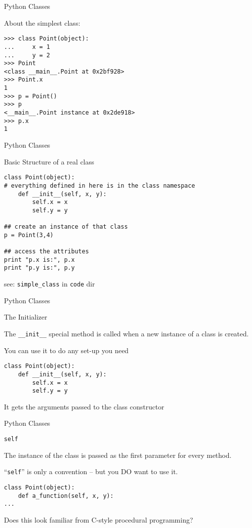 \documentclass{beamer}
\begin{document}
\begin{frame}[fragile]{Python Classes}

{\Large About the simplest class:}

\begin{verbatim}
>>> class Point(object):
...     x = 1
...     y = 2
>>> Point
<class __main__.Point at 0x2bf928>
>>> Point.x
1
>>> p = Point()
>>> p
<__main__.Point instance at 0x2de918>
>>> p.x
1
\end{verbatim}
\end{frame} 

\begin{frame}[fragile]{Python Classes}

{\Large Basic Structure of a real class}

\begin{verbatim}
class Point(object):
# everything defined in here is in the class namespace
    def __init__(self, x, y):
        self.x = x
        self.y = y

## create an instance of that class        
p = Point(3,4)

## access the attributes
print "p.x is:", p.x
print "p.y is:", p.y
\end{verbatim}

see: \verb|simple_class| in \verb|code| dir
\end{frame} 


\begin{frame}[fragile]{Python Classes}

{\LARGE The Initializer}

\vfill
{\Large The \verb|__init__| special method is called when a new instance of a class is created.}

\vfill
{\Large You can use it to do any set-up you need}

\vfill
\begin{verbatim}
class Point(object):
    def __init__(self, x, y):
        self.x = x
        self.y = y
\end{verbatim}
\vfill
{\Large It gets the arguments passed to the class constructor}
\end{frame} 

\begin{frame}[fragile]{Python Classes}

{\LARGE \verb|self|}

\vfill
{\Large The instance of the class is passed as the first parameter for every method.}

\vfill
{\Large ``\verb|self|'' is only a convention -- but you DO want to use it.}

\vfill
\begin{verbatim}
class Point(object):
    def a_function(self, x, y):
...
\end{verbatim}
\vfill
{\Large Does this look familiar from C-style procedural programming?}
\end{frame} 
\end{document}
